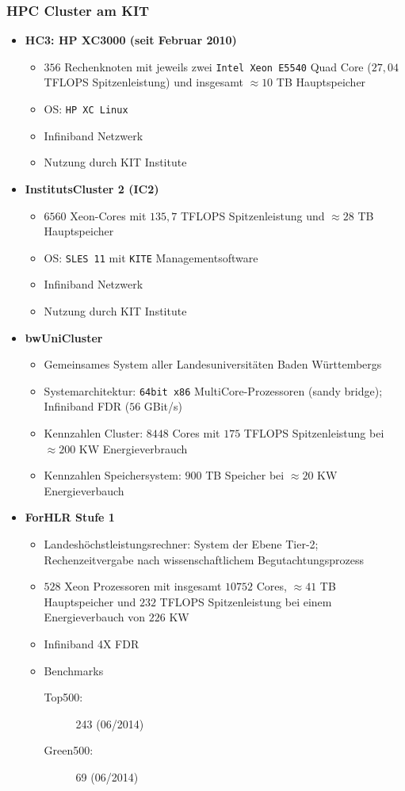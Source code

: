 \subsubsection{HPC Cluster am KIT}
\begin{itemize}
	\item \textbf{HC3: HP XC3000 (seit Februar 2010)}
	\begin{itemize}
		\item \(356\) Rechenknoten mit jeweils zwei \texttt{Intel Xeon E5540} Quad Core (\(27,04\) TFLOPS Spitzenleistung) und insgesamt \(\approx 10\) TB Hauptspeicher
		\item OS: \texttt{HP XC Linux}
		\item Infiniband Netzwerk
		\item Nutzung durch KIT Institute
	\end{itemize}
	\item \textbf{InstitutsCluster 2 (IC2)}
	\begin{itemize}
		\item \(6560\) Xeon-Cores mit \(135,7\) TFLOPS Spitzenleistung und \(\approx 28\) TB Hauptspeicher
		\item OS: \texttt{SLES 11} mit \texttt{KITE} Managementsoftware
		\item Infiniband Netzwerk
		\item Nutzung durch KIT Institute
	\end{itemize}
	\item \textbf{bwUniCluster}
	\begin{itemize}
		\item Gemeinsames System aller Landesuniversitäten Baden Württembergs
		\item Systemarchitektur: \texttt{64bit x86} MultiCore-Prozessoren (sandy bridge); Infiniband FDR (\(56\) GBit/s)
		\item Kennzahlen Cluster: \(8448\) Cores mit \(175\) TFLOPS Spitzenleistung bei \(\approx 200\) KW Energieverbrauch
		\item Kennzahlen Speichersystem: \(900\) TB Speicher bei \(\approx 20\) KW Energieverbauch
	\end{itemize}
	\item \textbf{ForHLR Stufe 1}
	\begin{itemize}
		\item Landeshöchstleistungsrechner: System der Ebene Tier-2; Rechenzeitvergabe nach wissenschaftlichem Begutachtungsprozess
		\item \(528\) Xeon Prozessoren mit insgesamt \(10752\) Cores, \(\approx 41\) TB Hauptspeicher und \(232\) TFLOPS Spitzenleistung bei einem Energieverbauch von \(226\) KW
		\item Infiniband 4X FDR
		\item Benchmarks
		\begin{description}
			\item[Top500:] 243 (06/2014)
			\item[Green500:] 69 (06/2014)
		\end{description}
	\end{itemize}
\end{itemize}


